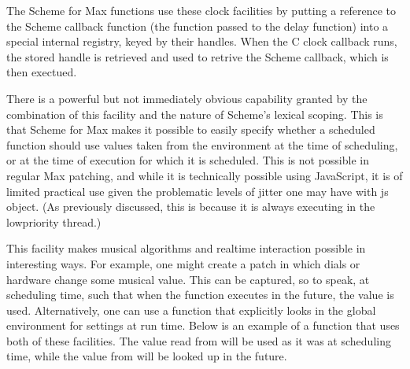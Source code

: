 \documentclass[letterpaper,10pt,english]{sphinxmanual}
\begin{document}
\sphinxAtStartPar
The Scheme for Max functions use these clock facilities by putting
a reference to the Scheme callback function (the function passed to the delay function)
into a special internal registry, keyed by their handles.
When the C clock callback runs, the stored handle is retrieved
and used to retrive the Scheme callback, which is then exectued.

\sphinxAtStartPar
There is a powerful but not immediately obvious capability granted by
the combination of this facility
and the nature of Scheme’s lexical scoping. This is that
Scheme for Max makes it possible to easily specify whether
a scheduled function should use values taken
from the environment at the time of scheduling,
or at the time of execution for which it is scheduled.
This is not possible in regular Max patching, and while it is technically
possible using JavaScript, it is of limited practical use given the
problematic levels of jitter one may have with js object.
(As previously discussed, this is because it is always executing in the low\sphinxhyphen{}priority thread.)

\sphinxAtStartPar
This facility makes musical algorithms and real\sphinxhyphen{}time interaction possible in
interesting ways. For example, one might create a patch in which
dials or hardware change some musical value. This can be captured,
so to speak, at scheduling time, such that when the function executes in the future,
the value  is used. Alternatively, one can
use a function that explicitly looks in the global environment
for settings at run time.
Below is an example of a function that uses both of these facilities.
The value read from  will be used as it was at scheduling
time, while the value from  will be looked up in the future.

\begin{sphinxVerbatim}[commandchars=\\\{\}]
\end{sphinxVerbatim}
\end{document}

